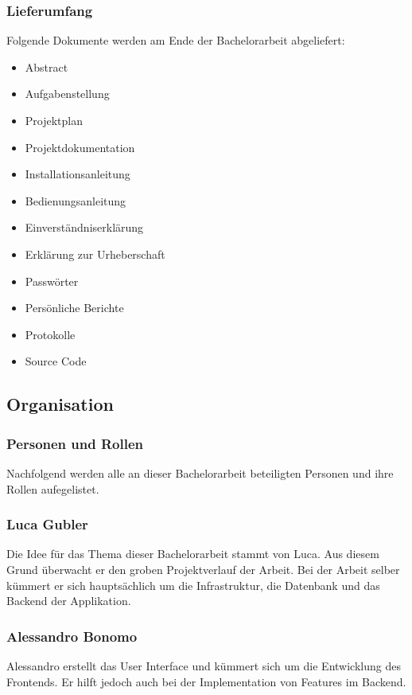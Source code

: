 \newpage

\subsubsection*{Lieferumfang}
Folgende Dokumente werden am Ende der Bachelorarbeit abgeliefert:
\begin{itemize}
	\itemsep0em
	\item Abstract
	\item Aufgabenstellung
	\item Projektplan
	\item Projektdokumentation
	\item Installationsanleitung
	\item Bedienungsanleitung
	\item Einverständniserklärung
	\item Erklärung zur Urheberschaft
	\item Passwörter
	\item Persönliche Berichte
	\item Protokolle
	\item Source Code	
\end{itemize}



\subsection{Organisation}
\subsubsection*{Personen und Rollen}
Nachfolgend werden alle an dieser Bachelorarbeit beteiligten Personen und ihre Rollen aufegelistet.

\subsubsection*{Luca Gubler}
Die Idee für das Thema dieser Bachelorarbeit stammt von Luca. Aus diesem Grund überwacht er den groben Projektverlauf der Arbeit. Bei der Arbeit selber kümmert er sich hauptsächlich um die Infrastruktur, die Datenbank und das Backend der Applikation.

\subsubsection*{Alessandro Bonomo}
Alessandro erstellt das User Interface und kümmert sich um die Entwicklung des Frontends. Er hilft jedoch auch bei der Implementation von Features im Backend.

